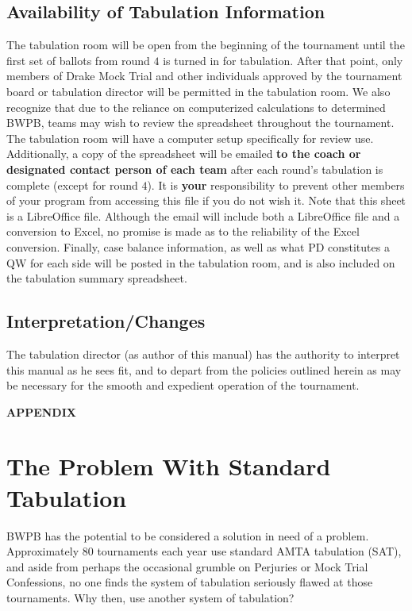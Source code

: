 \documentclass{article}
\begin{document}
\subsection{Availability of Tabulation Information}
The tabulation room will be open from the beginning of the tournament until the first set of ballots from round $4$ is turned in for tabulation.  After that point, only members of Drake Mock Trial and other individuals approved by the tournament board or tabulation director will be permitted in the tabulation room.  We also recognize that due to the reliance on computerized calculations to determined BWPB, teams may wish to review the spreadsheet throughout the tournament.  The tabulation room will have a computer setup specifically for review use.  Additionally, a copy of the spreadsheet will be emailed \textbf{to the coach or designated contact person of each team} after each round's tabulation is complete (except for round $4$). It is \textbf{your} responsibility to prevent other members of your program from accessing this file if you do not wish it. Note that this sheet is a LibreOffice file. Although the email will include both a LibreOffice file and a conversion to Excel, no promise is made as to the reliability of the Excel conversion. Finally, case balance information, as well as what PD constitutes a QW for each side will be posted in the tabulation room, and is also included on the tabulation summary spreadsheet.
\subsection{Interpretation/Changes}
The tabulation director (as author of this manual) has the authority to interpret this manual as he sees fit, and to depart from the policies outlined herein as may be necessary for the smooth and expedient operation of the tournament.
\break
\appendix
\begin{center}
      {\bf APPENDIX}
    \end{center}
\section{The Problem With Standard Tabulation}
BWPB has the potential to be considered a solution in need of a problem.  Approximately 80 tournaments each year use standard AMTA tabulation (SAT), and aside from perhaps the occasional grumble on Perjuries or Mock Trial Confessions, no one finds the system of tabulation seriously flawed at those tournaments.  Why then, use another system of tabulation?
\end{document}
